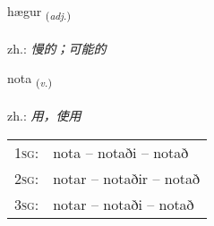 \documentclass[frontgrid, backgrid]{flacards}\usepackage[]{graphicx}\usepackage[]{xcolor}
\begin{document}
{hægur \small{\textsubscript{(\textit{adj.})}} \\[1ex] %
\textphonetic{[haiːɣʏr]} \\
zh.: \emph{慢的；可能的} \\  [2ex]
\renewcommand*{\arraystretch}{0.8}
}

\renewcommand{\flhead}{\vskip5pt \fboxsep=0pt {\small\bfseries\footnotesize Sagnorð | 动词}}
\renewcommand{\fcfoot}{\vskip5pt \fboxsep=0pt \hspace{2pt}{\small\bfseries\footnotesize 1K}}

\renewcommand{\blhead}{\vskip5pt {\small\bfseries\footnotesize Sagnorð | 动词 }}
\renewcommand{\bcfoot}{\vskip5pt \hspace{2pt}{\small\bfseries\footnotesize 1K}}


{nota \small{\textsubscript{(\textit{v.})}} \\[1ex] %
\textphonetic{[nɔːta]} \\
zh.: \emph{用，使用} \\  [2ex]
\renewcommand*{\arraystretch}{0.8}
\begin{tabular}{p{1cm}l}
\textsc{1sg}: & nota -- notaði -- notað \\ 
\textsc{2sg}: & notar -- notaðir -- notað \\ 
\textsc{3sg}: & notar -- notaði -- notað \\ 
\end{tabular}
}

\renewcommand{\flhead}{\vskip5pt \fboxsep=0pt {\small\bfseries\footnotesize Fornafn | 代词}}
\renewcommand{\fcfoot}{\vskip5pt \fboxsep=0pt \hspace{2pt}{\small\bfseries\footnotesize 1K}}
\end{document}

